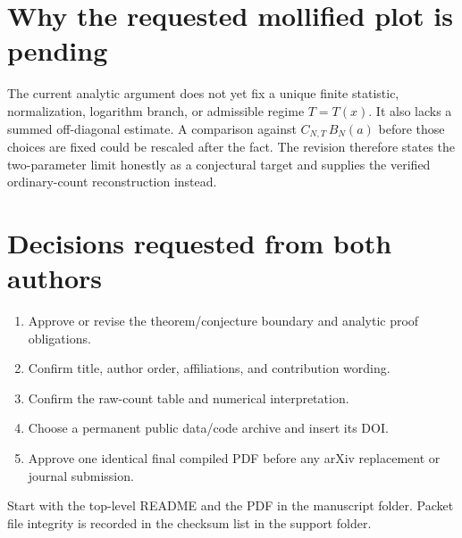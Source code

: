 \documentclass[11pt]{article}
\begin{document}
\section*{Why the requested mollified plot is pending}

The current analytic argument does not yet fix a unique finite statistic,
normalization, logarithm branch, or admissible regime $T=T(x)$. It also lacks a
summed off-diagonal estimate. A comparison against
$C_{N,T}\,B_N(a)$ before those choices are fixed could be rescaled after the
fact. The revision therefore states the two-parameter limit honestly as a
conjectural target and supplies the verified ordinary-count reconstruction
instead.

\section*{Decisions requested from both authors}

\begin{enumerate}
  \item Approve or revise the theorem/conjecture boundary and analytic proof
  obligations.
  \item Confirm title, author order, affiliations, and contribution wording.
  \item Confirm the raw-count table and numerical interpretation.
  \item Choose a permanent public data/code archive and insert its DOI.
  \item Approve one identical final compiled PDF before any arXiv replacement
  or journal submission.
\end{enumerate}

\vfill
\small\color{navy}
Start with the top-level README and the PDF in the manuscript folder. Packet
file integrity is recorded in the checksum list in the support folder.
\end{document}
